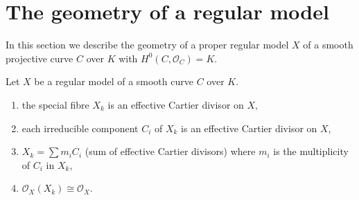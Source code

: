\section{The geometry of a regular model}
\label{section-special-fibre}

\noindent
In this section we describe the geometry of a proper regular model $X$ of a
smooth projective curve $C$ over $K$ with $H^0(C, \mathcal{O}_C) = K$.

\begin{lemma}
\label{lemma-divisor-special-fiber}
Let $X$ be a regular model of a smooth curve $C$ over $K$.
\begin{enumerate}
\item the special fibre $X_k$ is an effective Cartier divisor on $X$,
\item each irreducible component $C_i$ of $X_k$ is an effective
Cartier divisor on $X$,
\item $X_k = \sum m_i C_i$ (sum of effective Cartier divisors)
where $m_i$ is the multiplicity of $C_i$ in $X_k$,
\item $\mathcal{O}_X(X_k) \cong \mathcal{O}_X$.
\end{enumerate}
\end{lemma}

